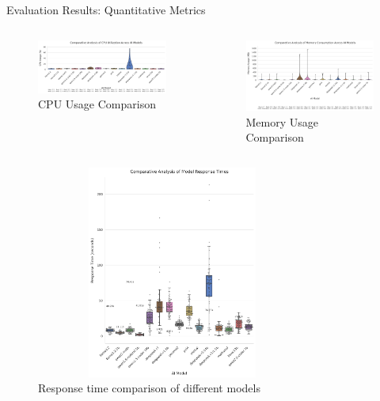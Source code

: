 \documentclass{beamer}
\begin{document}
\begin{frame}{Evaluation Results: Quantitative Metrics}
  \begin{columns}[t]
      \begin{figure}
        \centering
        \includegraphics[width=0.9\columnwidth]{model_cpu_usage_comparison.png}
        \caption{CPU Usage Comparison}
        \label{fig:cpu-usage}
      \end{figure}
      \begin{figure}
        \centering
        \includegraphics[width=0.9\columnwidth]{model_memory_usage_comparison.png}
        \caption{Memory Usage Comparison}
        \label{fig:memory-usage}
      \end{figure}
  \end{columns}
\end{frame}

\begin{frame}
  \begin{figure}
    \centering
    \caption{Response time comparison of different models}
    \label{fig:latency-comparison}
    \includegraphics[width=0.8\textwidth, height=7cm, keepaspectratio]{model_response_times_comparison.png}
  \end{figure}
\end{frame}
\end{document}
